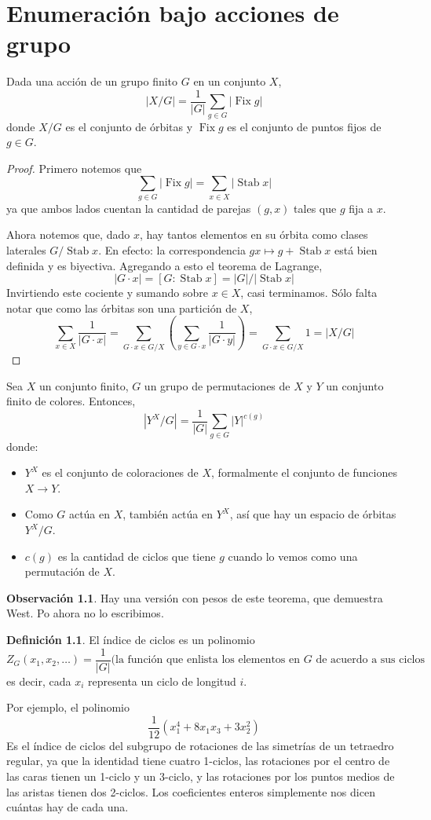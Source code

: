 \documentclass[spanish]{book}
\theoremstyle{definition}
\newtheorem*{defn}{Definición}
\newtheorem*{obs}{Observación}
\DeclareMathOperator{\Fix}{Fix}
\DeclareMathOperator{\Stab}{Stab}
\begin{document}
\chapter{Enumeración bajo acciones de grupo}
\begin{teo}
	Dada una acción de un grupo finito $G$ en un conjunto $X$,
	\[|X/G|=\frac{1}{|G|}\sum_{g\in G}|\Fix g|\]
	donde $X/G$ es el conjunto de órbitas y $\Fix g$ es el conjunto de puntos fijos de $g\in G$.
\end{teo}
\begin{proof}
	Primero notemos que 
	\[\sum_{g\in G}|\Fix g|=\sum_{x\in X}|\Stab x|\]
	ya que ambos lados cuentan la cantidad de parejas $(g,x)$ tales que $g$ fija a $x$.
	
	Ahora notemos que, dado $x$, hay tantos elementos en su órbita como clases laterales  $G/\Stab x$. En efecto: la correspondencia $gx\mapsto g+\Stab x$ está bien definida y es biyectiva. Agregando a esto el teorema de Lagrange,
	\[|G\cdot x|=[G:\Stab x]=|G|/|\Stab x|\]
	Invirtiendo este cociente y sumando sobre $x\in X$, casi terminamos. Sólo falta notar que como las órbitas son una partición de $X$,
	\[\sum_{x\in X}\frac{1}{|G\cdot x|}=\sum_{G\cdot x\in G/X}\left(\sum_{y\in G\cdot x}\frac{1}{|G\cdot y|}\right)=\sum_{G\cdot x\in G/X}1=|X/G|\]
\end{proof}
\begin{teo}
	Sea $X$ un conjunto finito, $G$ un grupo de permutaciones de $X$ y $Y$ un conjunto finito de colores. Entonces,
	\[|Y^X/G|=\frac{1}{|G|}\sum_{g\in G}|Y|^{c(g)}\]
	donde:
	\begin{itemize}
		\item $Y^X$ es el conjunto de coloraciones de $X$, formalmente el conjunto de funciones $X\to Y$.
		\item Como $G$ actúa en $X$, también actúa en $Y^X$, así que hay un espacio de órbitas $Y^X/G$.
		\item $c(g)$ es la cantidad de ciclos que tiene $g$ cuando lo vemos como una permutación de $X$.
	\end{itemize}
\end{teo}
\begin{obs}
	Hay una versión con pesos de este teorema, que demuestra West. Po ahora no lo escribimos.
\end{obs}
\begin{defn}
	El índice de ciclos es un polinomio
	\[Z_G(x_1,x_2,\ldots)=\frac{1}{|G|}(\text{la función que enlista los elementos en }G\text{ de acuerdo a sus ciclos}\]
	es decir, cada $x_i$ representa un ciclo de longitud $i$.
\end{defn}
Por ejemplo, el polinomio
\[\frac{1}{12}(x^4_1+8x_1x_3+3x^2_2)\]
Es el índice de ciclos del subgrupo de rotaciones de las simetrías de un tetraedro regular, ya que la identidad tiene cuatro 1-ciclos, las rotaciones por el centro de las caras tienen un 1-ciclo y un 3-ciclo, y las rotaciones por los puntos medios de las aristas tienen dos 2-ciclos. Los coeficientes enteros simplemente nos dicen cuántas hay de cada una.
\end{document}
